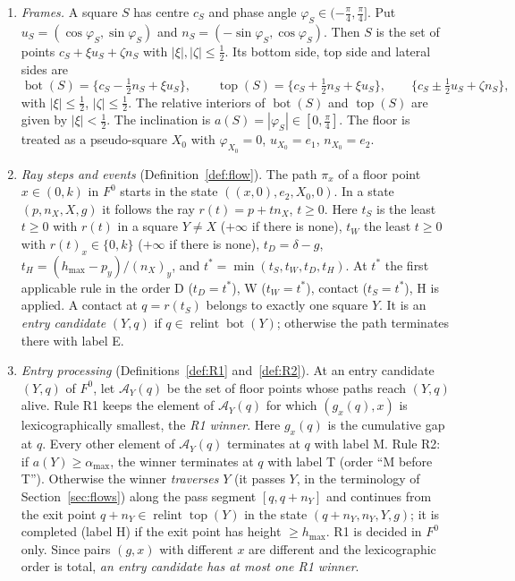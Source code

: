 \documentclass[11pt]{amsart}
\newcommand{\relint}{\operatorname{relint}}
\newcommand{\Bot}{\operatorname{bot}}
\newcommand{\Top}{\operatorname{top}}
\newcommand{\amax}{\alpha_{\max}}
\newcommand{\hmax}{h_{\max}}
\newcommand{\Fz}{F^{0}}
\theoremstyle{definition}
\theoremstyle{remark}
\numberwithin{equation}{section}
\begin{document}
\begin{enumerate}[(N1)]
\item \emph{Frames.} A square $S$ has centre $c_S$ and phase angle $\varphi_S\in(-\frac\pi4,\frac\pi4]$. Put $u_S=(\cos\varphi_S,\sin\varphi_S)$ and $n_S=(-\sin\varphi_S,\cos\varphi_S)$. Then $S$ is the set of points $c_S+\xi u_S+\zeta n_S$ with $|\xi|,|\zeta|\le\frac12$. Its bottom side, top side and lateral sides are
\[
\Bot(S)=\{c_S-\tfrac12n_S+\xi u_S\},\qquad \Top(S)=\{c_S+\tfrac12n_S+\xi u_S\},\qquad \{c_S\pm\tfrac12u_S+\zeta n_S\},
\]
with $|\xi|\le\frac12$, $|\zeta|\le\frac12$. The relative interiors of $\Bot(S)$ and $\Top(S)$ are given by $|\xi|<\frac12$. The inclination is $a(S)=|\varphi_S|\in[0,\frac\pi4]$. The floor is treated as a pseudo-square $X_0$ with $\varphi_{X_0}=0$, $u_{X_0}=e_1$, $n_{X_0}=e_2$.
\item \emph{Ray steps and events} (Definition~\ref{def:flow}). The path $\pi_x$ of a floor point $x\in(0,k)$ in $\Fz$ starts in the state $((x,0),e_2,X_0,0)$. In a state $(p,n_X,X,g)$ it follows the ray $r(t)=p+tn_X$, $t\ge0$. Here $t_S$ is the least $t\ge0$ with $r(t)$ in a square $Y\ne X$ ($+\infty$ if there is none), $t_W$ the least $t\ge0$ with $r(t)_x\in\{0,k\}$ ($+\infty$ if there is none), $t_D=\delta-g$, $t_H=(\hmax-p_y)/(n_X)_y$, and $t^*=\min(t_S,t_W,t_D,t_H)$. At $t^*$ the first applicable rule in the order D ($t_D=t^*$), W ($t_W=t^*$), contact ($t_S=t^*$), H is applied. A contact at $q=r(t_S)$ belongs to exactly one square $Y$. It is an \emph{entry candidate} $(Y,q)$ if $q\in\relint\Bot(Y)$; otherwise the path terminates there with label E.
\item \emph{Entry processing} (Definitions~\ref{def:R1} and~\ref{def:R2}). At an entry candidate $(Y,q)$ of $\Fz$, let $\mathcal A_Y(q)$ be the set of floor points whose paths reach $(Y,q)$ alive. Rule R1 keeps the element of $\mathcal A_Y(q)$ for which $(g_x(q),x)$ is lexicographically smallest, the \emph{R1 winner}. Here $g_x(q)$ is the cumulative gap at $q$. Every other element of $\mathcal A_Y(q)$ terminates at $q$ with label M. Rule R2: if $a(Y)\ge\amax$, the winner terminates at $q$ with label T (order ``M before T''). Otherwise the winner \emph{traverses} $Y$ (it passes $Y$, in the terminology of Section~\ref{sec:flows}) along the pass segment $[q,q+n_Y]$ and continues from the exit point $q+n_Y\in\relint\Top(Y)$ in the state $(q+n_Y,n_Y,Y,g)$; it is completed (label H) if the exit point has height $\ge\hmax$. R1 is decided in $\Fz$ only. Since pairs $(g,x)$ with different $x$ are different and the lexicographic order is total, \emph{an entry candidate has at most one R1 winner}.

\end{enumerate}
\end{document}
